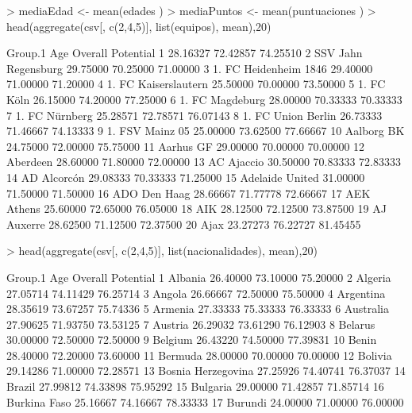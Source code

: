 \documentclass [a4paper] {article}
\begin{document}
\begin{Schunk}
\begin{Sinput}
> mediaEdad <- mean(edades )
> mediaPuntos <- mean(puntuaciones )
> head(aggregate(csv[, c(2,4,5)], list(equipos), mean),20)
\end{Sinput}
\begin{Soutput}
                 Group.1      Age  Overall Potential
1                        28.16327 72.42857  74.25510
2    SSV Jahn Regensburg 29.75000 70.25000  71.00000
3  1. FC Heidenheim 1846 29.40000 71.00000  71.20000
4   1. FC Kaiserslautern 25.50000 70.00000  73.50000
5             1. FC Köln 26.15000 74.20000  77.25000
6        1. FC Magdeburg 28.00000 70.33333  70.33333
7         1. FC Nürnberg 25.28571 72.78571  76.07143
8     1. FC Union Berlin 26.73333 71.46667  74.13333
9        1. FSV Mainz 05 25.00000 73.62500  77.66667
10            Aalborg BK 24.75000 72.00000  75.75000
11             Aarhus GF 29.00000 70.00000  70.00000
12              Aberdeen 28.60000 71.80000  72.00000
13            AC Ajaccio 30.50000 70.83333  72.83333
14           AD Alcorcón 29.08333 70.33333  71.25000
15       Adelaide United 31.00000 71.50000  71.50000
16          ADO Den Haag 28.66667 71.77778  72.66667
17            AEK Athens 25.60000 72.65000  76.05000
18                   AIK 28.12500 72.12500  73.87500
19            AJ Auxerre 28.62500 71.12500  72.37500
20                  Ajax 23.27273 76.22727  81.45455
\end{Soutput}
\begin{Sinput}
> head(aggregate(csv[, c(2,4,5)], list(nacionalidades), mean),20)
\end{Sinput}
\begin{Soutput}
              Group.1      Age  Overall Potential
1             Albania 26.40000 73.10000  75.20000
2             Algeria 27.05714 74.11429  76.25714
3              Angola 26.66667 72.50000  75.50000
4           Argentina 28.35619 73.67257  75.74336
5             Armenia 27.33333 75.33333  76.33333
6           Australia 27.90625 71.93750  73.53125
7             Austria 26.29032 73.61290  76.12903
8             Belarus 30.00000 72.50000  72.50000
9             Belgium 26.43220 74.50000  77.39831
10              Benin 28.40000 72.20000  73.60000
11            Bermuda 28.00000 70.00000  70.00000
12            Bolivia 29.14286 71.00000  72.28571
13 Bosnia Herzegovina 27.25926 74.40741  76.37037
14             Brazil 27.99812 74.33898  75.95292
15           Bulgaria 29.00000 71.42857  71.85714
16       Burkina Faso 25.16667 74.16667  78.33333
17            Burundi 24.00000 71.00000  76.00000

\end{Soutput}
\end{Schunk}
\end{document}
